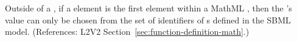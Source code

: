Outside of a \FunctionDefinition, if a  element is the
first element within a MathML , then the 's
value can only be chosen from the set of identifiers of
\FunctionDefinition{}s defined in the SBML model.
(References: L2V2 Section~\ref{sec:function-definition-math}.)
